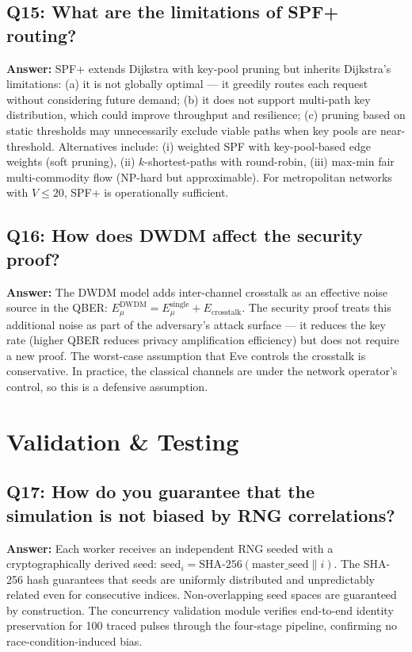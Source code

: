 \documentclass[11pt,a4paper,oneside]{report}
\begin{document}
\subsection*{Q15: What are the limitations of SPF+ routing?}
\textbf{Answer:} SPF+ extends Dijkstra with key-pool pruning but inherits Dijkstra's limitations: (a) it is not globally optimal — it greedily routes each request without considering future demand; (b) it does not support multi-path key distribution, which could improve throughput and resilience; (c) pruning based on static thresholds may unnecessarily exclude viable paths when key pools are near-threshold. Alternatives include: (i) weighted SPF with key-pool-based edge weights (soft pruning), (ii) $k$-shortest-paths with round-robin, (iii) max-min fair multi-commodity flow (NP-hard but approximable). For metropolitan networks with $V \leq 20$, SPF+ is operationally sufficient.

\subsection*{Q16: How does DWDM affect the security proof?}
\textbf{Answer:} The DWDM model adds inter-channel crosstalk as an effective noise source in the QBER: $E_\mu^{\text{DWDM}} = E_\mu^{\text{single}} + E_{\text{crosstalk}}$. The security proof treats this additional noise as part of the adversary's attack surface — it reduces the key rate (higher QBER reduces privacy amplification efficiency) but does not require a new proof. The worst-case assumption that Eve controls the crosstalk is conservative. In practice, the classical channels are under the network operator's control, so this is a defensive assumption.

\section{Validation \& Testing}

\subsection*{Q17: How do you guarantee that the simulation is not biased by RNG correlations?}
\textbf{Answer:} Each worker receives an independent RNG seeded with a cryptographically derived seed: $\text{seed}_i = \text{SHA-256}(\text{master\_seed} \| i)$. The SHA-256 hash guarantees that seeds are uniformly distributed and unpredictably related even for consecutive indices. Non-overlapping seed spaces are guaranteed by construction. The concurrency validation module verifies end-to-end identity preservation for 100 traced pulses through the four-stage pipeline, confirming no race-condition-induced bias.
\end{document}
